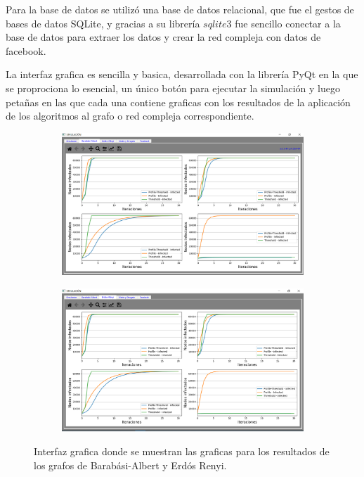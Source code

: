 \documentclass{article}
\begin{document}
Para la base de datos se utilizó una base de datos relacional, que fue el gestos de bases de datos SQLite, y gracias a su librería $sqlite3$ fue sencillo conectar a la base de datos para extraer los datos y crear la red compleja con datos de facebook.

La interfaz grafica es sencilla y basica, desarrollada con la librería PyQt en la que se proprociona lo esencial, un único botón para ejecutar la simulación y luego petañas en las que cada una contiene graficas con los resultados de la aplicación de los algoritmos al grafo o red compleja correspondiente. 

\begin{figure}[!tbp]
	\begin{subfigure}[b]{1\textwidth}
		\includegraphics[width=\textwidth]{../Images/GUI_1.PNG}
		\caption{}
		\label{fig:gui1}
	\end{subfigure}
	\begin{subfigure}[b]{1\textwidth}
		\includegraphics[width=\textwidth]{../Images/GUI_2.PNG}
		\caption{}
		\label{fig:gui2}
	\end{subfigure}
	\label{fig:graficas}
	\caption{Interfaz grafica donde se muestran las graficas para los resultados de los grafos de Barabási-Albert y Erdós Renyi.}
\end{figure}
\end{document}

